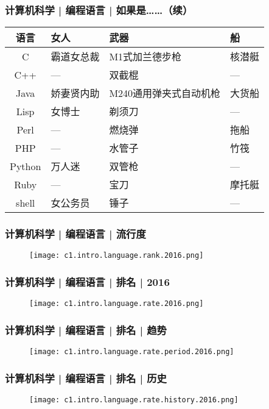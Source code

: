 \begin{frame}
  \frametitle{计算机科学 | 编程语言 | 如果是……（续）}
  \begin{table}
    \centering
    \begin{tabular}{clll}
      \hline
      \rowcolor{blue!50}语言 & 女人 & 武器 & 船\\
      \hline
      C & 霸道女总裁 & M1式加兰德步枪 & 核潜艇\\
      C++ & --- & 双截棍 & ---\\
      Java & 娇妻贤内助 & M240通用弹夹式自动机枪 & 大货船\\
      Lisp & 女博士 & 剃须刀 & ---\\
      Perl & --- & 燃烧弹 & 拖船\\
      PHP & --- & 水管子 & 竹筏\\
      Python & 万人迷 & 双管枪 & ---\\
      Ruby & --- & 宝刀 & 摩托艇\\
      shell & 女公务员 & 锤子 & ---\\
      \hline
    \end{tabular}
  \end{table}
\end{frame}

\begin{frame}
  \frametitle{计算机科学 | 编程语言 | 流行度}
  \begin{figure}
    \centering
    \texttt{[image: c1.intro.language.rank.2016.png]}
  \end{figure}
\end{frame}

\begin{frame}
  \frametitle{计算机科学 | 编程语言 | 排名 | 2016}
  \begin{figure}
    \centering
    \texttt{[image: c1.intro.language.rate.2016.png]}
  \end{figure}
\end{frame}

\begin{frame}
  \frametitle{计算机科学 | 编程语言 | 排名 | 趋势}
  \begin{figure}
    \centering
    \texttt{[image: c1.intro.language.rate.period.2016.png]}
  \end{figure}
\end{frame}

\begin{frame}
  \frametitle{计算机科学 | 编程语言 | 排名 | 历史}
  \begin{figure}
    \centering
    \texttt{[image: c1.intro.language.rate.history.2016.png]}
  \end{figure}
\end{frame}

